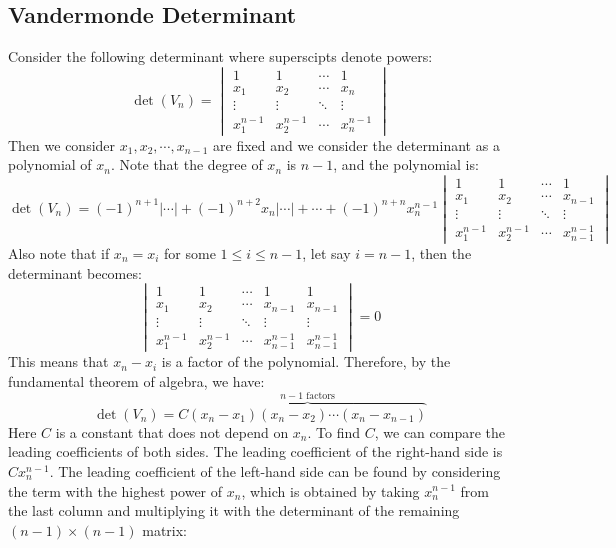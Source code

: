 \subsection{Vandermonde Determinant}
Consider the following determinant where superscipts denote powers:
\[
  \det(V_n) = \begin{vmatrix}
    1           & 1           & \cdots & 1           \\
    x_1         & x_2         & \cdots & x_n         \\
    \vdots      & \vdots      & \ddots & \vdots      \\
    x_1^{n - 1} & x_2^{n - 1} & \cdots & x_n^{n - 1}
  \end{vmatrix}
\]
Then we consider $x_1, x_2, \cdots, x_{n - 1}$ are fixed and we consider the determinant as a polynomial of $x_n$. Note that the degree of $x_n$ is $n - 1$, and the polynomial is:
\[
  \det(V_n) = {(-1)}^{n + 1} | \cdots | + {(-1)}^{n + 2} x_n | \cdots | + \cdots + {(-1)}^{n + n} x_n^{n - 1} \begin{vmatrix}
    1           & 1           & \cdots & 1                 \\
    x_1         & x_2         & \cdots & x_{n - 1}         \\
    \vdots      & \vdots      & \ddots & \vdots            \\
    x_1^{n - 1} & x_2^{n - 1} & \cdots & x_{n - 1}^{n - 1}
  \end{vmatrix}
\]
Also note that if $x_n = x_i$ for some $1 \leq i \leq n - 1$, let say $i = n - 1$, then the determinant becomes:
\[
  \begin{vmatrix}
    1           & 1           & \cdots & 1                 & 1                 \\
    x_1         & x_2         & \cdots & x_{n - 1}         & x_{n - 1}         \\
    \vdots      & \vdots      & \ddots & \vdots            & \vdots            \\
    x_1^{n - 1} & x_2^{n - 1} & \cdots & x_{n - 1}^{n - 1} & x_{n - 1}^{n - 1}
  \end{vmatrix} = 0
\]
This means that $x_n - x_i$ is a factor of the polynomial. Therefore, by the fundamental theorem of algebra, we have:
\[
  \det(V_n) = C \overbrace{(x_n - x_1)(x_n - x_2) \cdots (x_n - x_{n - 1})}^{n - 1 \text{ factors}}
\]
Here $C$ is a constant that does not depend on $x_n$. To find $C$, we can compare the leading coefficients of both sides. The leading coefficient of the right-hand side is $C x_n^{n - 1}$. The leading coefficient of the left-hand side can be found by considering the term with the highest power of $x_n$, which is obtained by taking $x_n^{n - 1}$ from the last column and multiplying it with the determinant of the remaining $(n - 1) \times (n - 1)$ matrix:
